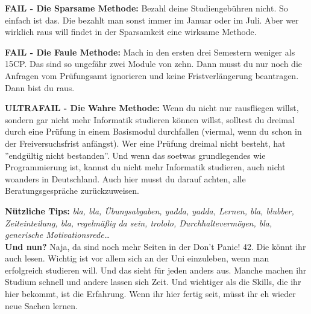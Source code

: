 \textbf{FAIL - Die Sparsame Methode:}
Bezahl deine Studiengeb\"uhren nicht. So einfach ist das. Die bezahlt man sonst immer im Januar oder im Juli. Aber wer wirklich raus will findet in der Sparsamkeit eine wirksame Methode.

\textbf{FAIL - Die Faule Methode:}
Mach in den ersten drei Semestern weniger als 15CP. Das sind so ungef\"ahr zwei Module von zehn. Dann musst du nur noch die Anfragen vom Pr\"ufungsamt ignorieren und keine Fristverl\"angerung beantragen. Dann bist du raus.

\textbf{ULTRAFAIL - Die Wahre Methode:}
Wenn du nicht nur rausfliegen willst, sondern gar nicht mehr Informatik
studieren k\"onnen willst, solltest du dreimal durch eine Pr\"ufung in einem
Basismodul durchfallen (viermal, wenn du schon in der Freiversuchsfrist
anf\"angst). Wer eine Pr\"ufung dreimal nicht besteht, hat ''endg\"ultig nicht
bestanden''. Und wenn das soetwas grundlegendes wie Programmierung ist, kannst
du nicht mehr Informatik studieren, auch nicht woanders in Deutschland. Auch
hier musst du darauf achten, alle Beratungsgespr\"ache zur\"uckzuweisen.

\textbf{N\"utzliche Tips:}
\emph{bla, bla, \"Ubungsabgaben, yadda, yadda, Lernen, bla, blubber, Zeiteinteilung, bla, regelm\"a{\ss}ig da sein, trololo, Durchhalteverm\"ogen, bla, generische Motivationsrede\dots}\\

\textbf{Und nun?}
Naja, da sind noch mehr Seiten in der Don't Panic! 42. Die k\"onnt ihr auch
lesen. Wichtig ist vor allem sich an der Uni einzuleben, wenn man erfolgreich
studieren will. Und das sieht f\"ur jeden anders aus. Manche machen ihr Studium
schnell und andere lassen sich Zeit. Und wichtiger als die Skills, die ihr hier
bekommt, ist die Erfahrung. Wenn ihr hier fertig seit, m\"usst ihr eh wieder
neue Sachen lernen.





